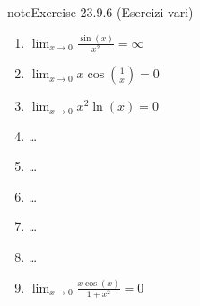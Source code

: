 \documentclass[letterpaper,10pt,italian]{jupyterBook}
\begin{document}
\begin{sphinxadmonition}{note}{Exercise 23.9.6 (Esercizi vari)}
\begin{enumerate}
\item {} 
\sphinxAtStartPar
\(\lim_{x \to 0} \frac{\sin(x)}{x^2} = \infty\)

\item {} 
\sphinxAtStartPar
\(\lim_{x \to 0} x \cos\left(\frac{1}{x}\right) = 0\)

\item {} 
\sphinxAtStartPar
\(\lim_{x \to 0} x^2 \ln(x) = 0\)

\item {} 
\sphinxAtStartPar
…

\item {} 
\sphinxAtStartPar
…

\item {} 
\sphinxAtStartPar
…

\item {} 
\sphinxAtStartPar
…

\item {} 
\sphinxAtStartPar
…

\item {} 
\sphinxAtStartPar
\(\lim_{x \to 0} \frac{x \cos(x)}{1 + x^2} = 0\)

\end{enumerate}
\end{sphinxadmonition}
\end{document}
